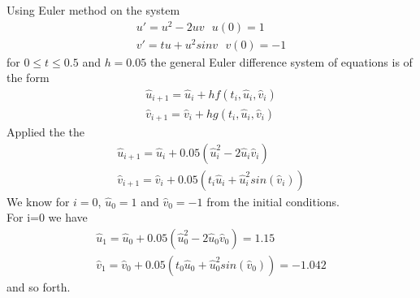 \begin{example}
Using Euler method on the system\[
\begin{array}{cl}
u'=u^2-2uv \ \ \ u(0)=1\\
v'=tu+u^2sinv \ \ \ v(0)=-1
\end{array}
\]
for $0\leq t \leq 0.5$ and $h=0.05$
the general Euler difference system of equations is of the form
\[\begin{array}{cl}
\hat{u}_{i+1}=\hat{u}_{i}+hf(t_i,\hat{u}_i,\hat{v}_i) \\
\hat{v}_{i+1}=\hat{v}_{i}+hg(t_i,\hat{u}_i,\hat{v}_i) 
\end{array}
\]
Applied the the 
\[\begin{array}{cl}
\hat{u}_{i+1}=\hat{u}_{i}+0.05(\hat{u}_i^2-2\hat{u}_i\hat{v}_i) \\
\hat{v}_{i+1}=\hat{v}_{i}+0.05(t_i\hat{u}_i+\hat{u}_i^2sin(\hat{v}_i)) 
\end{array}
\]
We know for $i=0$, $\hat{u}_0=1$ and $\hat{v}_0=-1$ from the initial
conditions.\\
For i=0 we have
\[\begin{array}{cl}
\hat{u}_{1}=\hat{u}_{0}+0.05(\hat{u}_0^2-2\hat{u}_0\hat{v}_0) =1.15\\
\hat{v}_{1}=\hat{v}_{0}+0.05(t_0\hat{u}_0+\hat{u}_0^2sin(\hat{v}_0))=-1.042 
\end{array}
\]
and so forth.
\end{example}
